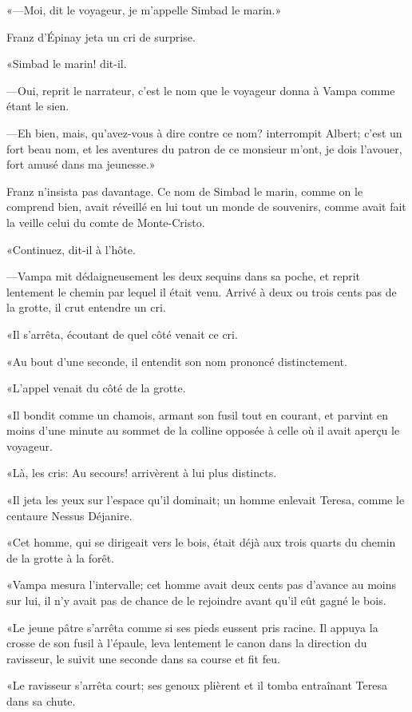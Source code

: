 «—Moi, dit le voyageur, je m'appelle Simbad le marin.» 

Franz d'Épinay jeta un cri de surprise.  

«Simbad le marin! dit-il. 

—Oui, reprit le narrateur, c'est le nom que le voyageur donna à Vampa comme étant le sien. 

—Eh bien, mais, qu'avez-vous à dire contre ce nom? interrompit Albert; c'est un fort beau nom, et les aventures du patron de ce monsieur m'ont, je dois l'avouer, fort amusé dans ma jeunesse.» 

Franz n'insista pas davantage. Ce nom de Simbad le marin, comme on le comprend bien, avait réveillé en lui tout un monde de souvenirs, comme avait fait la veille celui du comte de Monte-Cristo.  

«Continuez, dit-il à l'hôte. 

—Vampa mit dédaigneusement les deux sequins dans sa poche, et reprit lentement le chemin par lequel il était venu. Arrivé à deux ou trois cents pas de la grotte, il crut entendre un cri. 

«Il s'arrêta, écoutant de quel côté venait ce cri. 

«Au bout d'une seconde, il entendit son nom prononcé distinctement. 

«L'appel venait du côté de la grotte. 

«Il bondit comme un chamois, armant son fusil tout en courant, et parvint en moins d'une minute au sommet de la colline opposée à celle où il avait aperçu le voyageur. 

«Là, les cris: Au secours! arrivèrent à lui plus distincts. 

«Il jeta les yeux sur l'espace qu'il dominait; un homme enlevait Teresa, comme le centaure Nessus Déjanire. 

«Cet homme, qui se dirigeait vers le bois, était déjà aux trois quarts du chemin de la grotte à la forêt. 

«Vampa mesura l'intervalle; cet homme avait deux cents pas d'avance au moins sur lui, il n'y avait pas de chance de le rejoindre avant qu'il eût gagné le bois.  

«Le jeune pâtre s'arrêta comme si ses pieds eussent pris racine. Il appuya la crosse de son fusil à l'épaule, leva lentement le canon dans la direction du ravisseur, le suivit une seconde dans sa course et fit feu. 

«Le ravisseur s'arrêta court; ses genoux plièrent et il tomba entraînant Teresa dans sa chute. 

